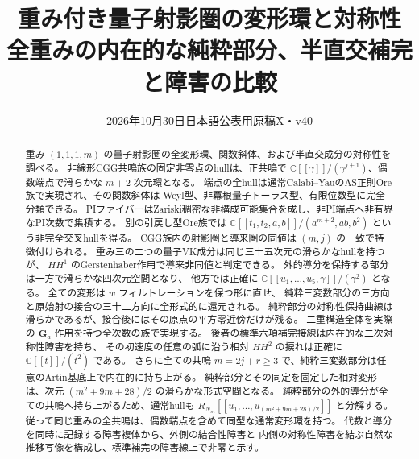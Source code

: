 
\title{重み付き量子射影圏の変形環と対称性\\
\large 全重みの内在的な純粋部分、半直交補完と障害の比較}
\author{}\date{2026年10月30日\quad 日本語公表用原稿X・v40}
\maketitle
\begin{abstract}
重み $(1,1,1,m)$ の量子射影圏の全変形環、関数斜体、および半直交成分の対称性を調べる。
非線形CGG共鳴族の固定非零点のhullは、正共鳴で
$\mathbb C[[\gamma]]/(\gamma^{j+1})$、偶数端点で滑らかな $m+2$ 次元環となる。
端点の全hullは通常Calabi--YauのAS正則Ore族で実現され、その関数斜体は
Weyl型、非冪根量子トーラス型、有限位数型に完全分類できる。
PIファイバーはZariski稠密な非構成可能集合を成し、非PI端点へ非有界なPI次数で集積する。
別の引戻し型Ore族では
$\mathbb C[[t_1,t_2,a,b]]/(a^{m+2},ab,b^2)$ という非完全交叉hullを得る。
CGG族内の射影圏と導来圏の同値は $(m,j)$ の一致で特徴付けられる。
重み三の二つの量子VK成分は同じ三十五次元の滑らかなhullを持つが、
$HH^1$ のGerstenhaber作用で導来非同値と判定できる。
外的導分を保持する部分は一方で滑らかな四次元空間となり、
他方では正確に $\mathbb C[[u_1,\ldots,u_5,\gamma]]/(\gamma^2)$ となる。
全ての変形は $w$ フィルトレーションを保つ形に直せ、
純粋三変数部分の三方向と原始射の接合の三十二方向に全形式的に還元される。
純粋部分の対称性保持曲線は滑らかであるが、接合後にはその原点の平方零近傍だけが残る。
二重構造全体を実際の $\mathbf G_a$ 作用を持つ全次数の族で実現する。
後者の標準六項補完接線は内在的な二次対称性障害を持ち、
その初速度の任意の弧に沿う相対 $HH^2$ の捩れは正確に
$\mathbb C[[t]]/(t^2)$ である。
さらに全ての共鳴 $m=2j+r\ge3$ で、純粋三変数部分は任意のArtin基底上で内在的に持ち上がる。
純粋部分とその同定を固定した相対変形は、次元 $(m^2+9m+28)/2$ の滑らかな形式空間となる。
純粋部分の外的導分が全ての共鳴へ持ち上がるため、通常hullも
$R_{N_m}[[u_1,\ldots,u_{(m^2+9m+28)/2}]]$ と分解する。
従って同じ重みの全共鳴は、偶数端点を含めて同型な通常変形環を持つ。
代数と導分を同時に記録する障害複体から、外側の結合性障害と
内側の対称性障害を結ぶ自然な推移写像を構成し、標準補完の障害線上で非零と示す。
\end{abstract}
\tableofcontents\clearpage





















